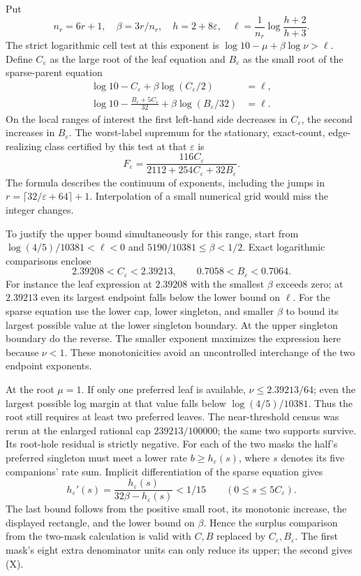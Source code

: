\documentclass[12pt,letterpaper]{article}
\begin{document}
Put
\[
 n_r=6r+1,\quad \beta=3r/n_r,\quad
 h=2+8\varepsilon,\quad \ell=\frac{1}{n_r}\log\frac{h+2}{h+3}.
\]
The strict logarithmic cell test at this exponent is \(\log10-\mu+\beta\log\nu>\ell\). Define \(C_\varepsilon\) as the large root of the leaf equation and \(B_\varepsilon\) as the small root of the sparse-parent equation
\begin{align*}
 \log10-C_\varepsilon+\beta\log(C_\varepsilon/2)&=\ell,\\
 \log10-\frac{B_\varepsilon+5C_\varepsilon}{32}
                           +\beta\log(B_\varepsilon/32)&=\ell .
\end{align*}
On the local ranges of interest the first left-hand side decreases in \(C_\varepsilon\), the second increases in \(B_\varepsilon\). The worst-label supremum for the stationary, exact-count, edge-realizing class certified by this test at that \(\varepsilon\) is
\[
 F_\varepsilon=
 \frac{116C_\varepsilon}{2112+254C_\varepsilon+32B_\varepsilon}.       \tag{X}
\]
The formula describes the continuum of exponents, including the jumps in \(r=\lceil32/\varepsilon+64\rceil+1\). Interpolation of a small numerical grid would miss the integer changes.

To justify the upper bound simultaneously for this range, start from
\(\log(4/5)/10381<\ell<0\) and \(5190/10381\le\beta<1/2\). Exact logarithmic comparisons enclose
\[
 2.39208<C_\varepsilon<2.39213,\qquad
 0.7058<B_\varepsilon<0.7064 .
\]
For instance the leaf expression at \(2.39208\) with the smallest \(\beta\) exceeds zero; at \(2.39213\) even its largest endpoint falls below the lower bound on \(\ell\). For the sparse equation use the lower cap, lower singleton, and smaller \(\beta\) to bound its largest possible value at the lower singleton boundary. At the upper singleton boundary do the reverse. The smaller exponent maximizes the expression here because \(\nu<1\). These monotonicities avoid an uncontrolled interchange of the two endpoint exponents.

At the root \(\mu=1\). If only one preferred leaf is available, \(\nu\le 2.39213/64\); even the largest possible log margin at that value falls below \(\log(4/5)/10381\). Thus the root still requires at least two preferred leaves. The near-threshold census was rerun at the enlarged rational cap \(239213/100000\); the same two supports survive. Its root-hole residual is strictly negative. For each of the two masks the half's preferred singleton must meet a lower rate \(b\ge h_\varepsilon(s)\), where \(s\) denotes its five companions' rate sum. Implicit differentiation of the sparse equation gives
\[
 h_\varepsilon'(s)=
   \frac{h_\varepsilon(s)}{32\beta-h_\varepsilon(s)}<1/15
       \qquad (0\le s\le5C_\varepsilon).
\]
The last bound follows from the positive small root, its monotonic increase, the displayed rectangle, and the lower bound on \(\beta\). Hence the surplus comparison from the two-mask calculation is valid with \(C,B\) replaced by \(C_\varepsilon,B_\varepsilon\). The first mask's eight extra denominator units can only reduce its upper; the second gives (X).
\end{document}
